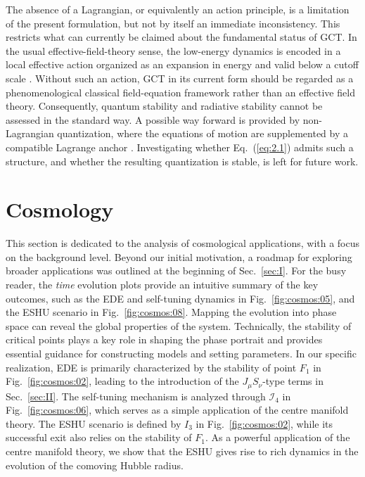 \documentclass[aps,prd,twocolumn]{revtex4-2}
\begin{document}
The absence of a Lagrangian, or equivalently an action principle, is a limitation of the present formulation, but not by itself an immediate inconsistency. This restricts what can currently be claimed about the fundamental status of GCT. In the usual effective-field-theory sense, the low-energy dynamics is encoded in a local effective action organized as an expansion in energy and valid below a cutoff scale \cite{Donoghue1994.PRD.50.3874,Burgess2007.AnnuRevNuclPartSci.57.329}. Without such an action, GCT in its current form should be regarded as a phenomenological classical field-equation framework rather than an effective field theory. Consequently, quantum stability and radiative stability cannot be assessed in the standard way. A possible way forward is provided by non-Lagrangian quantization, where the equations of motion are supplemented by a compatible Lagrange anchor \cite{Kazinski2005.JHighEnergyPhys.07.076,Lyakhovich2007.JHighEnergyPhys.01.047}. Investigating whether Eq.~(\ref{eq:2.1}) admits such a structure, and whether the resulting quantization is stable, is left for future work.


\section{Cosmology}\label{sec:III}
This section is dedicated to the analysis of cosmological applications, with a focus on the background level. Beyond our initial motivation, a roadmap for exploring broader applications was outlined at the beginning of Sec.~\ref{sec:I}. For the busy reader, the \textit{time} evolution plots provide an intuitive summary of the key outcomes, such as the EDE and self-tuning dynamics in Fig.~\ref{fig:cosmos:05}, and the ESHU scenario in Fig.~\ref{fig:cosmos:08}. Mapping the evolution into phase space can reveal the global properties of the system. Technically, the stability of critical points plays a key role in shaping the phase portrait and provides essential guidance for constructing models and setting parameters. In our specific realization, EDE is primarily characterized by the stability of point $F_1$ in Fig.~\ref{fig:cosmos:02}, leading to the introduction of the $J_\mu S_\nu$-type terms in Sec.~\ref{sec:II}. The self-tuning mechanism is analyzed through $\mathcal{I}_4$ in Fig.~\ref{fig:cosmos:06}, which serves as a simple application of the centre manifold theory. The ESHU scenario is defined by $I_3$ in Fig.~\ref{fig:cosmos:02}, while its successful exit also relies on the stability of $F_1$. As a powerful application of the centre manifold theory, we show that the ESHU gives rise to rich dynamics in the evolution of the comoving Hubble radius.
\end{document}
